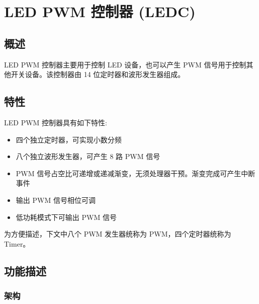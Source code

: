 \documentclass[main\_\_CN.tex]{subfiles}
\begin{document}
\setchineseformatting

\ifglobal
\else
    {\let\clearpage\relax \listoftodos}
    {\let\clearpage\relax \listofdonetodos}
    \tableofcontents
\fi



\hypertarget{ledpwm}{}
\chapter{LED PWM 控制器 (LEDC)}
\label{mod:ledpwm}

\section{概述}

LED PWM 控制器主要用于控制 LED 设备，也可以产生 PWM 信号用于控制其他开关设备。该控制器由 14 位定时器和波形发生器组成。

\section{特性}
LED PWM 控制器具有如下特性:
\begin{itemize}
    \item 四个独立定时器，可实现小数分频
    \item 八个独立波形发生器，可产生 8 路 PWM 信号
    \item PWM 信号占空比可递增或递减渐变，无须处理器干预。渐变完成可产生中断事件
    \item 输出 PWM 信号相位可调
    \item 低功耗模式下可输出 PWM 信号

\end{itemize}

为方便描述，下文中八个 PWM 发生器统称为 PWM，四个定时器统称为 Timer。

\section{功能描述}

\subsection{架构}
\end{document}

